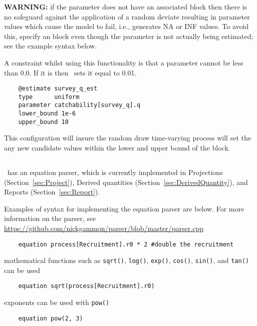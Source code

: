 \textbf{WARNING:} if the parameter does not have an associated  block then there is no safeguard against the application of a random deviate resulting in parameter values which cause the model to fail, i.e., generates NA or INF values. To avoid this, specify an  block even though the parameter is not actually being estimated; see the example syntax below.

A constraint whilst using this functionality is that a parameter cannot be less than 0.0. If it is then \CNAME\ sets it equal to 0.01.

{\small{\begin{verbatim}
	@estimate survey_q_est
	type      uniform
	parameter catchability[survey_q].q
	lower_bound 1e-6
	upper_bound 10
\end{verbatim}}}

This configuration will insure the random draw time-varying process will set the any new candidate values within the lower and upper bound of the  block.

\subsection{\label{sec:eq_parser}} 

\CNAME\ has an equation parser, which is currently implemented in Projections (Section~\ref{sec:Project}), Derived quantities (Section~\ref{sec:DerivedQuantity}), and Reports (Section~\ref{sec:Report}).

Examples of syntax for implementing the equation parser are below. For more information on the parser, see \url{https://github.com/nickgammon/parser/blob/master/parser.cpp}

{\small{\begin{verbatim}
	equation process[Recruitment].r0 * 2 #double the recruitment
\end{verbatim}}}

mathematical functions such as \texttt{sqrt()}, \texttt{log()},  \texttt{exp()},  \texttt{cos()}, \texttt{sin()}, and \texttt{tan()} can be used

{\small{\begin{verbatim}
	equation sqrt(process[Recruitment].r0)
\end{verbatim}}}

exponents can be used with \texttt{pow()}

{\small{\begin{verbatim}
	equation pow(2, 3)
\end{verbatim}}}

